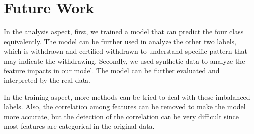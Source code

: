 \documentclass{article}
\begin{document}
\section{Future Work}
In the analysis aspect, first, we trained a model that can predict the four class equivalently. The model can be further used in analyze the other two labels, which is withdrawn and certified withdrawn to understand specific pattern that may indicate the withdrawing. Secondly, we used synthetic data to analyze the feature impacts in our model. The model can be further evaluated and interpreted by the real data. 

In the training aspect, more methods can be tried to deal with these imbalanced labels. Also, the correlation among features can be removed to make the model more accurate, but the detection of the correlation can be very difficult since most features are categorical in the original data. 



\end{document}
